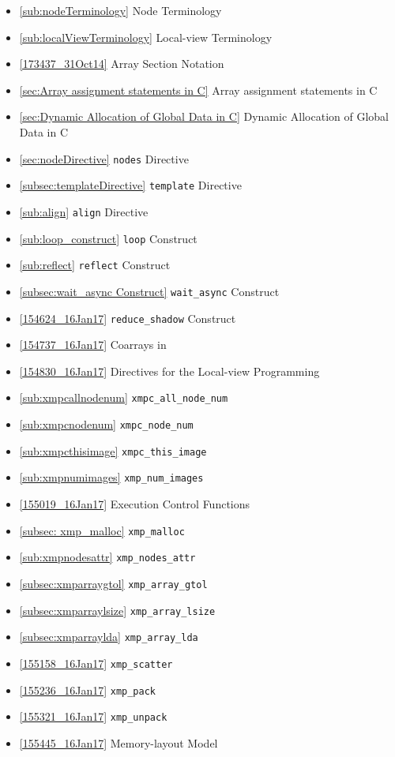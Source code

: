 \begin{itemize}
  \item \ref{sub:nodeTerminology}      Node Terminology
  \item \ref{sub:localViewTerminology} Local-view Terminology
  \item \ref{173437_31Oct14}           Array Section Notation
  \item \ref{sec:Array assignment statements in C} Array assignment
		statements in C
  \item \ref{sec:Dynamic Allocation of Global Data in C} Dynamic
		Allocation of Global Data in C
  \item \ref{sec:nodeDirective}        {\tt nodes} Directive
  \item \ref{subsec:templateDirective} {\tt template} Directive
  \item \ref{sub:align}                {\tt align} Directive
  \item \ref{sub:loop_construct}       {\tt loop} Construct
  \item \ref{sub:reflect}              {\tt reflect} Construct
  \item \ref{subsec:wait_async Construct} {\tt wait\_async} Construct
  \item \ref{154624_16Jan17}           {\tt reduce\_shadow} Construct
  \item \ref{154737_16Jan17}           Coarrays in {\XMPC}
  \item \ref{154830_16Jan17}           Directives for the Local-view
		Programming
  \item \ref{sub:xmpcallnodenum}       {\tt xmpc\_all\_node\_num}
  \item \ref{sub:xmpcnodenum}          {\tt xmpc\_node\_num}
  \item \ref{sub:xmpcthisimage}        {\tt xmpc\_this\_image}
  \item \ref{sub:xmpnumimages}         {\tt xmp\_num\_images}
  \item \ref{155019_16Jan17}           Execution Control Functions
  \item \ref{subsec: xmp_malloc}       {\tt xmp\_malloc}
  \item \ref{sub:xmpnodesattr}         {\tt xmp\_nodes\_attr}
  \item \ref{subsec:xmparraygtol}      {\tt xmp\_array\_gtol}
  \item \ref{subsec:xmparraylsize}     {\tt xmp\_array\_lsize}
  \item \ref{subsec:xmparraylda}       {\tt xmp\_array\_lda}
  \item \ref{155158_16Jan17}           {\tt xmp\_scatter}
  \item \ref{155236_16Jan17}           {\tt xmp\_pack}
  \item \ref{155321_16Jan17}           {\tt xmp\_unpack}
  \item \ref{155445_16Jan17}           Memory-layout Model
\end{itemize}


